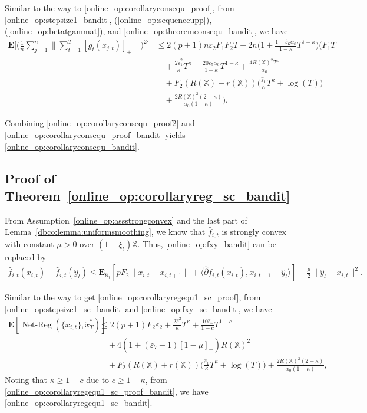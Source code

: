 \documentclass[12pt,draftcls,onecolumn]{IEEEtran}%
\DeclareMathOperator{\NetReg}{Net-Reg}
\begin{document}
 Similar to the way to \eqref{online_op:corollaryconsequ_proof}, from \eqref{online_op:stepsize1_bandit}, (\ref{online_op:sequenceupp}), (\ref{online_op:betatgammat}), and \eqref{online_op:theoremconsequ_bandit}, we have
\begin{align}\label{online_op:corollaryconsequ_proof_bandit}
\mathbf{E}\Big[\Big(\frac{1}{n}\sum_{j=1}^n\Big\|\sum_{t=1}^T[g_{t}(x_{j,t})]_+\Big\|\Big)^2\Big]
&\le 2(p+1)n\varepsilon_2F_1F_2T
+2n\Big(1+\frac{1+\hat{\varepsilon}_6\alpha_0}{1-\kappa}T^{1-\kappa}\Big)
\Big(F_1T\nonumber\\
&\quad +\frac{2\hat{\varepsilon}^2_1}{\kappa}T^\kappa+\frac{20\hat{\varepsilon}_5\alpha_0}{1-\kappa}T^{1-\kappa}
+\frac{4R(\mathbb{X})^2T^\kappa}{\alpha_0}\nonumber\\
&\quad+F_2(R(\mathbb{X})+r(\mathbb{X}))\Big(\frac{\hat{\varepsilon}_1}{\kappa}T^\kappa+\log(T)\Big)\nonumber\\
&\quad+\frac{2R(\mathbb{X})^2(2-\kappa)}{\alpha_0(1-\kappa)}\Big).
\end{align}

Combining \eqref{online_op:corollaryconsequ_proof2} and \eqref{online_op:corollaryconsequ_proof_bandit} yields \eqref{online_op:corollaryconsequ_bandit}.


\subsection{Proof of Theorem~\ref{online_op:corollaryreg_sc_bandit}}\label{online_op:corollaryregproof_sc_bandit}

 From Assumption~\ref{online_op:assstrongconvex} and the last part of Lemma~\ref{dbco:lemma:uniformsmoothing}, we know that $\hat{f}_{i,t}$ is strongly convex with constant $\mu>0$ over $(1-\xi_t)\mathbb{X}$. Thus, \eqref{online_op:fxy_bandit} can be replaced by
\begin{align}\label{online_op:fxy_sc_bandit}
\hat{f}_{i,t}(x_{i,t})-\hat{f}_{i,t}(\hat{y}_t)\le \mathbf{E}_{\mathfrak{U}_{t}}[pF_2\|x_{i,t}-x_{i,t+1}\|
+\langle\hat{\partial}f_{i,t}(x_{i,t}),x_{i,t+1}-\hat{y}_t\rangle]-\frac{\mu}{2}\|\hat{y}_t-x_{i,t}\|^2.
\end{align}

Similar to the way to get \eqref{online_op:corollaryregequ1_sc_proof}, from \eqref{online_op:stepsize1_sc_bandit}  and \eqref{online_op:fxy_sc_bandit}, we have
\begin{align}\label{online_op:corollaryregequ1_sc_proof_bandit}
\mathbf{E}[\NetReg(\{x_{i,t}\},\check{x}^*_{T})]
&\le 2(p+1)F_2\varepsilon_2
+\frac{2\hat{\varepsilon}^2_1}{\kappa}T^\kappa+\frac{10\hat{\varepsilon}_5}{1-c}T^{1-c}\nonumber\\
&\quad+4(1+(\varepsilon_7-1)[1-\mu]_+)R(\mathbb{X})^2\nonumber\\
&\quad+F_2(R(\mathbb{X})+r(\mathbb{X}))\Big(\frac{\hat{\varepsilon}_1}{\kappa}
T^\kappa+\log(T)\Big)+\frac{2R(\mathbb{X})^2(2-\kappa)}{\alpha_0(1-\kappa)},
\end{align}
Noting that $\kappa\ge1-c$ due to $c\ge1-\kappa$, from \eqref{online_op:corollaryregequ1_sc_proof_bandit}, we have \eqref{online_op:corollaryregequ1_sc_bandit}.
\end{document}
